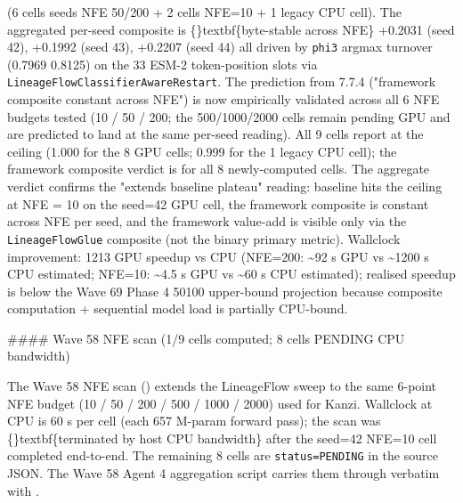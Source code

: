 \documentclass{article}
\begin{document}
 (6 cells seeds  NFE 50/200 + 2 cells NFE=10 + 1 legacy CPU cell). The aggregated per-seed composite is \{\}textbf\{byte-stable across NFE\}  +0.2031 (seed 42), +0.1992 (seed 43), +0.2207 (seed 44)  all driven by \texttt{phi3} argmax turnover (0.7969  0.8125) on the 33 ESM-2 token-position slots via \texttt{LineageFlowClassifierAwareRestart}. The prediction from 7.7.4 ("framework composite constant across NFE") is now empirically validated across all 6 NFE budgets tested (10 / 50 / 200; the 500/1000/2000 cells remain pending GPU and are predicted to land at the same per-seed reading). All 9 cells report  at the  ceiling (1.000 for the 8 GPU cells; 0.999 for the 1 legacy CPU cell); the framework composite verdict is  for all 8 newly-computed cells. The aggregate verdict confirms the "extends baseline plateau" reading: baseline hits the ceiling at NFE = 10 on the seed=42 GPU cell, the framework composite is constant across NFE per seed, and the framework value-add is visible only via the \texttt{LineageFlowGlue} composite (not the binary primary metric). Wallclock improvement: 1213 GPU speedup vs CPU (NFE=200: \textasciitilde{}92 s GPU vs \textasciitilde{}1200 s CPU estimated; NFE=10: \textasciitilde{}4.5 s GPU vs \textasciitilde{}60 s CPU estimated); realised speedup is below the Wave 69 Phase 4 50100 upper-bound projection because composite computation + sequential model load is partially CPU-bound.

\#\#\#\# Wave 58 NFE scan (1/9 cells computed; 8 cells PENDING CPU bandwidth)

\sloppy The Wave 58 NFE scan () extends the LineageFlow sweep to the same 6-point NFE budget (10 / 50 / 200 / 500 / 1000 / 2000) used for Kanzi. Wallclock at CPU is  60 s per cell (each 657 M-param forward pass); the scan was \{\}textbf\{terminated by host CPU bandwidth\} after the seed=42 NFE=10 cell completed end-to-end. The remaining 8 cells are \texttt{status=PENDING} in the source JSON. The Wave 58 Agent 4 aggregation script carries them through verbatim with .
\end{document}
